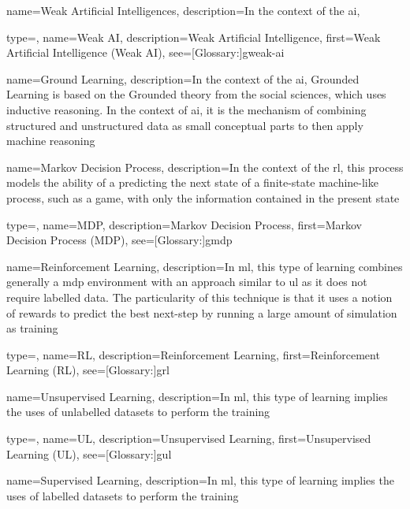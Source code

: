 {
  name={Weak Artificial Intelligences},
  description={In the context of the \gls{ai}, }
}

{
  type=\acronymtype,
  name={Weak AI},
  description={Weak Artificial Intelligence},
  first={Weak Artificial Intelligence (Weak AI)},
  see=[Glossary:]{gweak-ai}
}

{
  name={Ground Learning},
  description={In the context of the \gls{ai}, Grounded Learning is based on the Grounded theory from the social sciences, which uses inductive reasoning. In the context of \gls{ai}, it is the mechanism of combining structured and unstructured data as small conceptual parts to then apply machine reasoning}
}


{
  name={Markov Decision Process},
  description={In the context of the \gls{rl}, this process models the ability of a predicting the next state of a finite-state machine-like process, such as a game, with only the information contained in the present state}
}

{
  type=\acronymtype,
  name={MDP},
  description={Markov Decision Process},
  first={Markov Decision Process (MDP)},
  see=[Glossary:]{gmdp}
}

{
  name={Reinforcement Learning},
  description={In \gls{ml}, this type of learning combines generally a \gls{mdp} environment with an approach similar to \gls{ul} as it does not require labelled data. The particularity of this technique is that it uses a notion of rewards to predict the best next-step by running a large amount of simulation as training}
}

{
  type=\acronymtype,
  name={RL},
  description={Reinforcement Learning},
  first={Reinforcement Learning (RL)},
  see=[Glossary:]{grl}
}

{
  name={Unsupervised Learning},
  description={In \gls{ml}, this type of learning implies the uses of unlabelled datasets to perform the training}
}

{
  type=\acronymtype,
  name={UL},
  description={Unsupervised Learning},
  first={Unsupervised Learning (UL)},
  see=[Glossary:]{gul}
}

{
  name={Supervised Learning},
  description={In \gls{ml}, this type of learning implies the uses of labelled datasets to perform the training}
}

